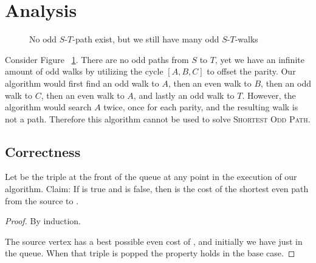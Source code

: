 \section{Analysis}

\begin{figure}
    \centering
    
    \caption{No odd $S$-$T$-path exist, but we still have many odd $S$-$T$-walks}
    \label{figure:small2}
\end{figure}

Consider Figure ~\ref{figure:small2}. There are no odd paths from $S$ to $T$, yet we have an infinite amount of odd walks by utilizing the cycle $[A,B,C]$ to offset the parity. Our algorithm would first find an odd walk to $A$, then an even walk to $B$, then an odd walk to $C$, then an even walk to $A$, and lastly an odd walk to $T$. However, the algorithm would search $A$ twice, once for each parity, and the resulting walk is not a path. Therefore this algorithm cannot be used to solve \textsc{Shortest Odd Path}.

\subsection{Correctness}
Let  be the triple at the front of the queue at any point in the execution of our algorithm.
Claim: If  is true and  is false, then  is the cost of the shortest even path from the source to .

\begin{proof}
By induction. 

The source vertex  has a best possible even cost of , and initially we have just  in the queue. When that triple is popped the property holds in the base case.


\end{proof}

